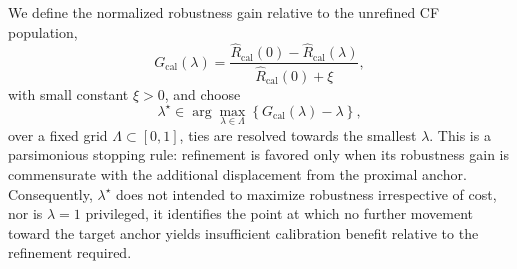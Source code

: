 We define the normalized robustness gain relative to the unrefined CF population,
\begin{equation}
 G_{\mathrm{cal}}(\lambda)
 =
 \frac{
 \widehat{R}_{\mathrm{cal}}(0)
 -
 \widehat{R}_{\mathrm{cal}}(\lambda)
 }{
 \widehat{R}_{\mathrm{cal}}(0)+\xi
 },
 \label{eq:calibration_gain}
 \end{equation}
 with small constant $\xi>0$, and choose
 \begin{equation}
 \lambda^\star
 \in
 \arg\max_{\lambda\in\Lambda}
 \left\{
 G_{\mathrm{cal}}(\lambda)-\lambda
 \right\},
 \label{eq:lambda_calibration}
 \end{equation}
 over a fixed grid $\Lambda\subset[0,1]$, ties are resolved towards the smallest $\lambda$.
This is a parsimonious stopping rule:
refinement is favored only when its robustness gain is commensurate with the additional displacement from the proximal anchor.
Consequently, $\lambda^\star$ does not intended to maximize robustness irrespective of cost, nor is $\lambda=1$ privileged, it identifies the point at which no further movement toward the target anchor yields insufficient calibration benefit relative to the refinement required. 

